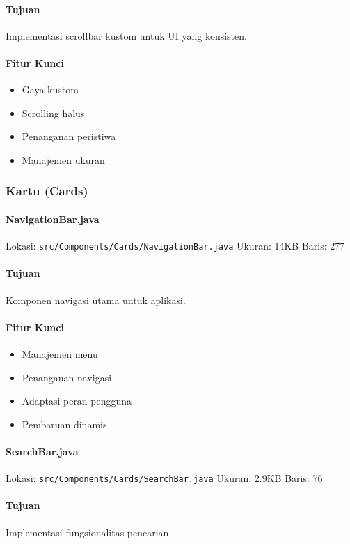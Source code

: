 \documentclass[12pt,a4paper]{article}
\begin{document}
\paragraph{Tujuan}
Implementasi scrollbar kustom untuk UI yang konsisten.

\paragraph{Fitur Kunci}
\begin{itemize}
    \item Gaya kustom
    \item Scrolling halus
    \item Penanganan peristiwa
    \item Manajemen ukuran
\end{itemize}

\subsubsection{Kartu (Cards)}
\paragraph{NavigationBar.java}
Lokasi: \texttt{src/Components/Cards/NavigationBar.java}
Ukuran: 14KB
Baris: 277

\paragraph{Tujuan}
Komponen navigasi utama untuk aplikasi.

\paragraph{Fitur Kunci}
\begin{itemize}
    \item Manajemen menu
    \item Penanganan navigasi
    \item Adaptasi peran pengguna
    \item Pembaruan dinamis
\end{itemize}

\paragraph{SearchBar.java}
Lokasi: \texttt{src/Components/Cards/SearchBar.java}
Ukuran: 2.9KB
Baris: 76

\paragraph{Tujuan}
Implementasi fungsionalitas pencarian.
\end{document}
